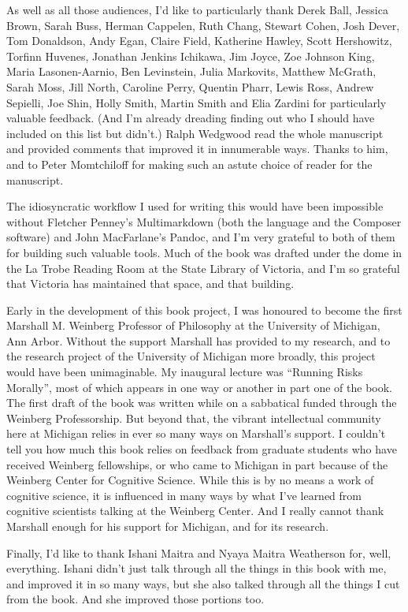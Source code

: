 \documentclass[
  10pt,
  letterpaper,
  twoside]{scrbook}
\begin{document}
As well as all those audiences, I'd like to particularly thank Derek
Ball, Jessica Brown, Sarah Buss, Herman Cappelen, Ruth Chang, Stewart
Cohen, Josh Dever, Tom Donaldson, Andy Egan, Claire Field, Katherine
Hawley, Scott Hershowitz, Torfinn Huvenes, Jonathan Jenkins Ichikawa,
Jim Joyce, Zoe Johnson King, Maria Lasonen-Aarnio, Ben Levinstein, Julia
Markovits, Matthew McGrath, Sarah Moss, Jill North, Caroline Perry,
Quentin Pharr, Lewis Ross, Andrew Sepielli, Joe Shin, Holly Smith,
Martin Smith and Elia Zardini for particularly valuable feedback. (And
I'm already dreading finding out who I should have included on this list
but didn't.) Ralph Wedgwood read the whole manuscript and provided
comments that improved it in innumerable ways. Thanks to him, and to
Peter Momtchiloff for making such an astute choice of reader for the
manuscript.

The idiosyncratic workflow I used for writing this would have been
impossible without Fletcher Penney's Multimarkdown (both the language
and the Composer software) and John MacFarlane's Pandoc, and I'm very
grateful to both of them for building such valuable tools. Much of the
book was drafted under the dome in the La Trobe Reading Room at the
State Library of Victoria, and I'm so grateful that Victoria has
maintained that space, and that building.

Early in the development of this book project, I was honoured to become
the first Marshall M. Weinberg Professor of Philosophy at the University
of Michigan, Ann Arbor. Without the support Marshall has provided to my
research, and to the research project of the University of Michigan more
broadly, this project would have been unimaginable. My inaugural lecture
was ``Running Risks Morally'', most of which appears in one way or
another in part one of the book. The first draft of the book was written
while on a sabbatical funded through the Weinberg Professorship. But
beyond that, the vibrant intellectual community here at Michigan relies
in ever so many ways on Marshall's support. I couldn't tell you how much
this book relies on feedback from graduate students who have received
Weinberg fellowships, or who came to Michigan in part because of the
Weinberg Center for Cognitive Science. While this is by no means a work
of cognitive science, it is influenced in many ways by what I've learned
from cognitive scientists talking at the Weinberg Center. And I really
cannot thank Marshall enough for his support for Michigan, and for its
research.

Finally, I'd like to thank Ishani Maitra and Nyaya Maitra Weatherson
for, well, everything. Ishani didn't just talk through all the things in
this book with me, and improved it in so many ways, but she also talked
through all the things I cut from the book. And she improved those
portions too.
\end{document}
